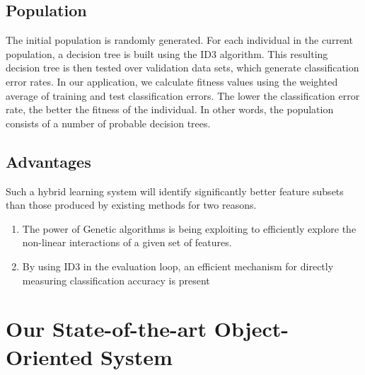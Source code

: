 \documentclass[12pt]{report}
\begin{document}
\section{Population}
The initial population is randomly generated. For each individual in the current population, a decision tree is built using the ID3 algorithm. This resulting decision tree is then tested over validation data sets, which generate classification error rates. In our application, we calculate fitness values using the weighted average of training and test classification errors. The lower the classification error rate, the better the fitness of the
individual. In other words, the population consists of a number of probable decision trees.

\section{Advantages}
Such a hybrid learning system will identify significantly better feature subsets than those produced by existing methods for two reasons. 
\begin{enumerate}
\item{The power of Genetic algorithms is being exploiting to efficiently explore the non-linear interactions of a given set of features.}
\item{By using ID3 in the evaluation loop, an efficient mechanism for directly measuring classification accuracy is present}

\end{enumerate}


\pagestyle{fancy}
\chead{}
\rfoot{\small{\thepage}}
\renewcommand{\headrulewidth}{0.4pt}
\renewcommand{\footrulewidth}{0.4pt}
\chapter{Our State-of-the-art Object-Oriented System}
\end{document}

